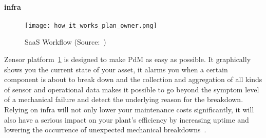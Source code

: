 \paragraph{\ac{infra}} 
\begin{figure}[ht]
    \centering
    \texttt{[image: how\_it\_works\_plan\_owner.png]}
    \caption{\acl{SaaS} Workflow (Source:~\cite{Misc:zensor_official_website})}
    \label{fig:zensor_flow}
\end{figure}
Zensor platform~\ref{fig:zensor_flow} is designed to make \ac{PdM} as easy as possible. It graphically shows you the current state of your asset, it alarms you when a certain component is about to
break down and the collection and aggregation of all kinds of sensor and operational data makes it possible to go beyond the symptom level of a mechanical failure 
and detect the underlying reason for the breakdown. Relying on \ac{infra} will not only lower your maintenance costs significantly, 
it will also have a serious impact on your plant’s efficiency by increasing uptime and lowering the occurrence of unexpected mechanical breakdowns~\cite{Misc:vaningelgem_2020_what}.

